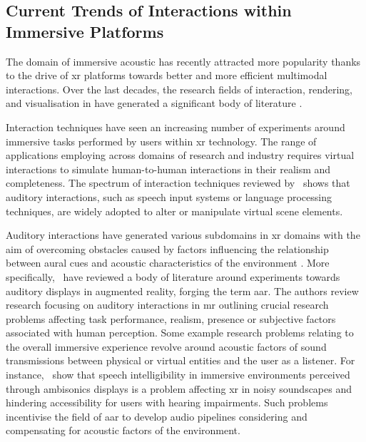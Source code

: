 \subsection{Current Trends of Interactions within Immersive Platforms}
The domain of immersive acoustic has recently attracted more popularity thanks to the drive of \acrshort{xr} platforms towards better and more efficient multimodal interactions. Over the last decades, the research fields of interaction, rendering, and visualisation in  have generated a significant body of literature \citep{kim2018revisiting}.\par
Interaction techniques have seen an increasing number of experiments around immersive tasks performed by users within \acrshort{xr} technology. The range of applications employing  across domains of research and industry requires virtual interactions to simulate human-to-human interactions in their realism and completeness. The spectrum of interaction techniques reviewed by~\cite{spittle2022review} shows that auditory interactions, such as speech input systems or language processing techniques, are widely adopted to alter or manipulate virtual scene elements.\par
Auditory interactions have generated various subdomains in \acrshort{xr} domains with the aim of overcoming obstacles caused by factors influencing the relationship between aural cues and acoustic characteristics of the environment \citep{park2022metaverse}.
More specifically,~\cite{yang2022audio} have reviewed a body of literature around experiments towards auditory displays in augmented reality, forging the term \acrfull{aar}. The authors review research focusing on auditory interactions in \acrshort{mr} outlining crucial research problems affecting task performance, realism, presence or subjective factors associated with human perception. Some example research problems relating to the overall immersive experience revolve around acoustic factors of sound transmissions between physical or virtual entities and the user as a listener. For instance,~\cite{mansour2021speech} show that speech intelligibility in immersive environments perceived through ambisonics displays is a problem affecting \acrshort{xr} in noisy soundscapes and hindering accessibility for users with hearing impairments. Such problems incentivise the field of \acrshort{aar} to develop audio pipelines considering and compensating for acoustic factors of the environment.\par

